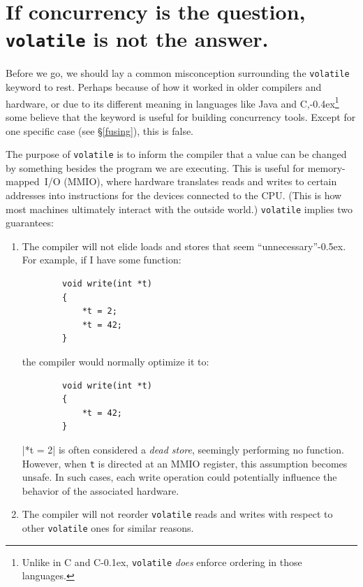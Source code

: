 \documentclass[fontsize=10pt, oneside]{scrartcl}
\newcommand{\codesize}{\fontsize{\bodyfontsize}{\bodybaselineskip}}
\newcommand{\punckern}{\kern-0.4ex}
\newcommand{\quotekern}{\kern-0.5ex}
\newcommand{\monobox}[1]{\mbox{\texttt{#1}}}
\newcommand{\keyword}[1]{\monobox{\color{darkGreen}#1}}
\newcommand{\cplusplus}[1]{C\kern-0.1ex\raisebox{0.15ex}{\texttt{++}}#1}
\newcommand{\clang}[1]{C#1}
\newcommand{\csharp}{C\raisebox{0.25ex}{\#}}
\newcommand{\introduce}[1]{\textit{#1}}
\newcommand{\secref}[1]{\hyperref[#1]{\textsc{\S}\ref*{#1}}}
\begin{document}
\section{If concurrency is the question, \texttt{volatile} is not the answer.}

Before we go, we should lay a common misconception surrounding the \keyword{volatile} keyword to rest.
Perhaps because of how it worked in older compilers and hardware,
or due to its different meaning in languages like Java and \csharp,\punckern\footnote{Unlike in \clang{} and \cplusplus{},
\keyword{volatile} \emph{does} enforce ordering in those languages.}
some believe that the keyword is useful for building concurrency tools.
Except for one specific case (see \secref{fusing}), this is false.

The purpose of \keyword{volatile} is to inform the compiler that a value can be changed by something besides the program we are executing.
This is useful for memory-mapped~\textsc{I/O} (\textsc{MMIO}),
where hardware translates reads and writes to certain addresses into instructions for the devices connected to the \textsc{CPU}.
(This is how most machines ultimately interact with the outside world.)
\keyword{volatile} implies two guarantees:
\begin{enumerate}
  \item The compiler will not elide loads and stores that seem ``unnecessary''\quotekern.
        For example, if I have some function:
        \begin{verbatim}
        void write(int *t)
        {
            *t = 2;
            *t = 42;
        }
        \end{verbatim}
        the compiler would normally optimize it to:
        \begin{verbatim}
        void write(int *t)
        {
            *t = 42;
        }
        \end{verbatim}
        \cpp|*t = 2| is often considered a \introduce{dead store},
        seemingly performing no function.
        However, when \texttt{t} is directed at an \textsc{MMIO} register,
        this assumption becomes unsafe.
        In such cases, each write operation could potentially influence the behavior of the associated hardware.

  \item The compiler will not reorder \keyword{volatile} reads and writes with respect to other \keyword{volatile} ones for similar reasons.
\end{enumerate}
\end{document}

